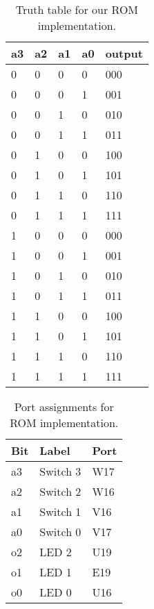 \documentclass[11pt]{article}
\begin{document}
\begin{table}[h]
\begin{center}
\begin{tabular}{| l | l | l | l | l |}
	\hline
	a3 & a2 & a1 & a0 & output \\ \hline
	0 & 0 & 0 & 0 & 000 \\ \hline
	0 & 0 & 0 & 1 & 001 \\ \hline
	0 & 0 & 1 & 0 & 010 \\ \hline
	0 & 0 & 1 & 1 & 011 \\ \hline
	0 & 1 & 0 & 0 & 100 \\ \hline
	0 & 1 & 0 & 1 & 101 \\ \hline
	0 & 1 & 1 & 0 & 110 \\ \hline
	0 & 1 & 1 & 1 & 111 \\ \hline
	1 & 0 & 0 & 0 & 000 \\ \hline
	1 & 0 & 0 & 1 & 001 \\ \hline
	1 & 0 & 1 & 0 & 010 \\ \hline
	1 & 0 & 1 & 1 & 011 \\ \hline
	1 & 1 & 0 & 0 & 100 \\ \hline
	1 & 1 & 0 & 1 & 101 \\ \hline
	1 & 1 & 1 & 0 & 110 \\ \hline
	1 & 1 & 1 & 1 & 111 \\ \hline
\end{tabular}
\caption{\label{tab:romTruthTable}Truth table for our ROM implementation.}
\end{center}
\end{table}

\begin{table}[h]
\begin{center}
\begin{tabular}{| l | l | l |}
	\hline
	Bit & Label & Port \\ \hline
	a3 & Switch 3 & W17 \\ \hline
	a2 & Switch 2 & W16 \\ \hline
	a1 & Switch 1 & V16 \\ \hline
	a0 & Switch 0 & V17 \\ \hline
	o2 & LED 2 & U19 \\ \hline
	o1 & LED 1 & E19 \\ \hline
	o0 & LED 0 & U16 \\ \hline
\end{tabular}
\caption{\label{tab:romPorts}Port assignments for ROM implementation.}
\end{center}
\end{table}
\end{document}
